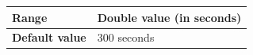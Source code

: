 \documentclass{template/openetcs}
\begin{document}
\begin{itemize}
\begin{longtable}{|l|l|}
				\hline
																																									
					\begin{minipage}[t]{0.22\linewidth} \textbf{Range}	\end{minipage} 
				&	\begin{minipage}[t]{0.78\linewidth} Double value (in seconds) \end{minipage} \\
				
				\hline
				
					\begin{minipage}[t]{0.22\linewidth} \textbf{Default value}	\end{minipage} 
				&	\begin{minipage}[t]{0.78\linewidth} 300 seconds \end{minipage} \\
				
				\hline				
			\end{longtable}
			
	\end{itemize}
\end{document}
